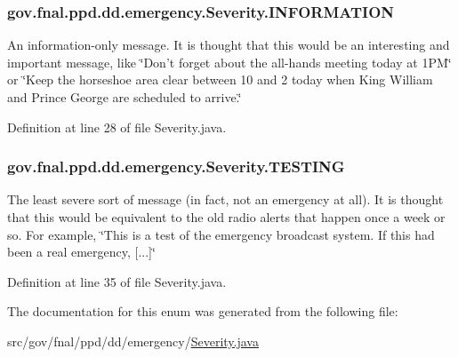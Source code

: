 \hypertarget{enumgov_1_1fnal_1_1ppd_1_1dd_1_1emergency_1_1Severity_aaf755550765aa7e569baf503397ecd12}{
\subsubsection[{I\-N\-F\-O\-R\-M\-A\-T\-I\-O\-N}]{\setlength{\rightskip}{0pt plus 5cm}gov.\-fnal.\-ppd.\-dd.\-emergency.\-Severity.\-I\-N\-F\-O\-R\-M\-A\-T\-I\-O\-N}}\label{enumgov_1_1fnal_1_1ppd_1_1dd_1_1emergency_1_1Severity_aaf755550765aa7e569baf503397ecd12}
An information-\/only message. It is thought that this would be an interesting and important message, like \char`\"{}\-Don't forget about the all-\/hands meeting today at 1\-P\-M\char`\"{} or \char`\"{}\-Keep the horseshoe area clear between 10 and 2 today when King William and Prince George are scheduled to arrive.\char`\"{} 

Definition at line 28 of file Severity.\-java.

\hypertarget{enumgov_1_1fnal_1_1ppd_1_1dd_1_1emergency_1_1Severity_ac5e5ede059fb831322252943bb24a7d5}{
\subsubsection[{T\-E\-S\-T\-I\-N\-G}]{\setlength{\rightskip}{0pt plus 5cm}gov.\-fnal.\-ppd.\-dd.\-emergency.\-Severity.\-T\-E\-S\-T\-I\-N\-G}}\label{enumgov_1_1fnal_1_1ppd_1_1dd_1_1emergency_1_1Severity_ac5e5ede059fb831322252943bb24a7d5}
The least severe sort of message (in fact, not an emergency at all). It is thought that this would be equivalent to the old radio alerts that happen once a week or so. For example, \char`\"{}\-This is a test of the emergency broadcast system.  If this had been a real emergency, \mbox{[}...\mbox{]}\char`\"{} 

Definition at line 35 of file Severity.\-java.



The documentation for this enum was generated from the following file\-:\begin{DoxyCompactItemize}
\item 
src/gov/fnal/ppd/dd/emergency/\hyperlink{Severity_8java}{Severity.\-java}\end{DoxyCompactItemize}
